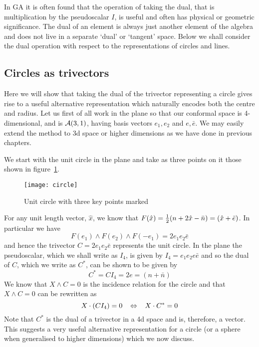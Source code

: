 In GA it is often found that the operation of taking the dual, that
is multiplication by the pseudoscalar $I$, is useful and
often has physical or geometric significance. The dual of an element
is always just another element of the algebra and does not live
in a separate `dual' or `tangent' space. Below we shall consider
the dual operation with respect to the representations of circles 
and lines.

\subsection{Circles as trivectors}
\label{sec:circles}

Here we will show that taking the dual of the trivector representing
a circle gives rise to a useful alternative representation which
naturally encodes both the centre and radius.
Let us first of all work in the plane so that our conformal space is
4-dimensional, and is
${\mathcal{A}}(3,1)$, having basis vectors $e_1,e_2$ and $e,\bar{e}$. We may
easily extend the method to 3d space or higher dimensions as we have done
in previous chapters. 

We start with the unit circle in the plane and take as three points
on it those shown in figure~\ref{figcircle}.
\begin{figure}
\centerline{
\texttt{[image: circle]}
} \caption{Unit circle with three key points marked}
\label{figcircle}
\end{figure}
%
For any unit length vector, $\hat{x}$, we know that
$F(\hat{x})= \frac{1}{2} ( n + 2\hat{x} -\bar{n}) = (\hat{x} + \bar{e})$.
In particular we have
%
\[ F(e_1) \wedge F(e_2) \wedge F(-e_1) = 2e_1e_2\bar{e} \]
%
and hence the trivector $C = 2e_1e_2\bar{e}$ represents the unit circle.
In the plane the pseudoscalar, which we shall write as $I_4$,
is given by $I_4 = e_1e_2e\bar{e}$ and so the dual of
$C$, which we write as $C^{*}$, can be shown to be
given by
%
\begin{equation}
 C^{*}=CI_4 = 2e = (n+\bar{n})
 \end{equation}
We know that $X\wedge C=0$ is the incidence relation for the circle  and that
$X \wedge C = 0 $ can be rewritten as
%
\[ X \cdot (CI_4) =0  \;\;\; \Leftrightarrow \;\;\; X\cdot C^{*} = 0  \]
%
Note that $C^{*}$ is the dual of a trivector in a 4d space and is, therefore,
a vector. This suggests a very useful alternative representation
for a circle (or a sphere when generalised to higher dimensions) which we now
discuss.

